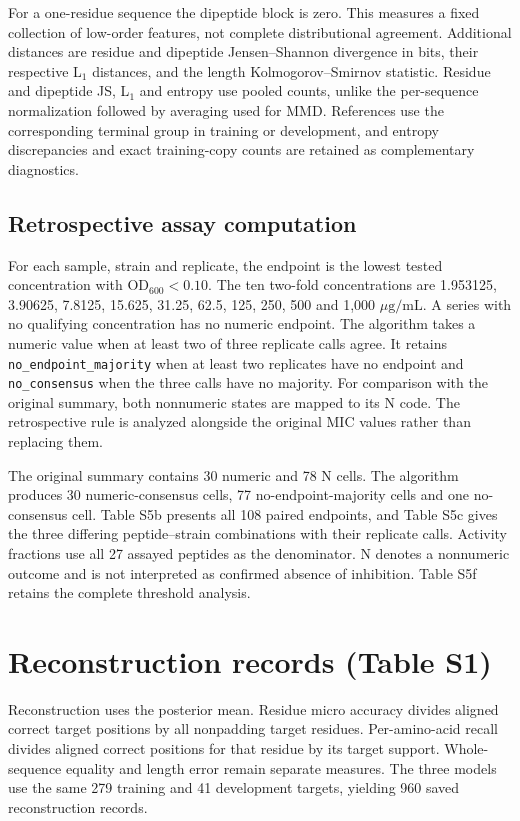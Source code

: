 \documentclass[11pt,a4paper]{article}
\newcommand{\ug}{\ensuremath{\mu\mathrm{g}/\mathrm{mL}}}
\begin{document}
For a one-residue sequence the dipeptide block is zero. This measures a fixed collection of low-order features, not complete distributional agreement. Additional distances are residue and dipeptide Jensen--Shannon divergence in bits, their respective L$_{1}$ distances, and the length Kolmogorov--Smirnov statistic. Residue and dipeptide JS, L$_{1}$ and entropy use pooled counts, unlike the per-sequence normalization followed by averaging used for MMD. References use the corresponding terminal group in training or development, and entropy discrepancies and exact training-copy counts are retained as complementary diagnostics.

\subsection*{Retrospective assay computation}
For each sample, strain and replicate, the endpoint is the lowest tested concentration with OD$_{600}<0.10$. The ten two-fold concentrations are 1.953125, 3.90625, 7.8125, 15.625, 31.25, 62.5, 125, 250, 500 and 1,000 \ug. A series with no qualifying concentration has no numeric endpoint. The algorithm takes a numeric value when at least two of three replicate calls agree. It retains \texttt{no\_endpoint\_majority} when at least two replicates have no endpoint and \texttt{no\_consensus} when the three calls have no majority. For comparison with the original summary, both nonnumeric states are mapped to its N code. The retrospective rule is analyzed alongside the original MIC values rather than replacing them.

The original summary contains 30 numeric and 78 N cells. The algorithm produces 30 numeric-consensus cells, 77 no-endpoint-majority cells and one no-consensus cell. Table S5b presents all 108 paired endpoints, and Table S5c gives the three differing peptide--strain combinations with their replicate calls. Activity fractions use all 27 assayed peptides as the denominator. N denotes a nonnumeric outcome and is not interpreted as confirmed absence of inhibition. Table S5f retains the complete threshold analysis.

\section{Reconstruction records (Table S1)}
Reconstruction uses the posterior mean. Residue micro accuracy divides aligned correct target positions by all nonpadding target residues. Per-amino-acid recall divides aligned correct positions for that residue by its target support. Whole-sequence equality and length error remain separate measures. The three models use the same 279 training and 41 development targets, yielding 960 saved reconstruction records.

\end{document}
